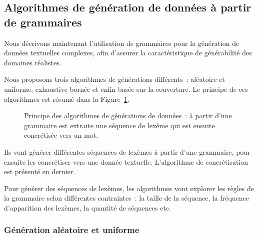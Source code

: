 %
%

\subsection{Algorithmes de génération de données à partir de grammaires}
\label{subsection:data:algorithms}

Nous décrivons maintenant l'utilisation de grammaires pour la génération de
données textuelles complexes, afin d'assurer la caractéristique de générabilité
des domaines réalistes.

Nous proposons trois algorithmes de générations différents~: aléatoire et
uniforme, exhaustive bornée et enfin basée sur la couverture. Le principe de
ces algorithmes est résumé dans la Figure~\ref{figure:data:grammar}.
%
\begin{figure}


\caption{\label{figure:data:grammar} Principe des algorithmes de générations de
données~: à partir d'une grammaire est extraite une séquence de lexème qui est
ensuite concrétisée vers un mot.}

\end{figure}
%
Ils vont générer différentes séquences de lexèmes à partir d'une grammaire, pour
ensuite les concrétiser vers une donnée textuelle. L'algorithme de
concrétisation est présenté en dernier.

Pour générer des séquences de lexèmes, les algorithmes vont explorer les règles
de la grammaire selon différentes contraintes~: la taille de la séquence, la
fréquence d'apparition des lexèmes, la quantité de séquences etc.

\subsubsection{Génération aléatoire et uniforme}
\label{subsection:data:random_uniform_generation}

